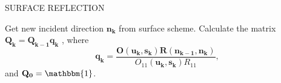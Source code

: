 \begin{minipage}{7cm}
\begin{sf}
SURFACE REFLECTION

Get new incident direction $\mathbf{n_k}$ from surface scheme.
Calculate the matrix $\mathbf{Q_k}=\mathbf{Q_{k-1}q_k}$
, where
\[
\mathbf{q_k}=\frac{\mathbf{O(u_k,s_k)R(n_{k-1},n_k)}}
  {O_{11}(\mathbf{u_{k},s_k})R_{11}} ,
\]
and $\mathbf{Q_0}=\mathbbm{1}$.
\end{sf}
\end{minipage}

